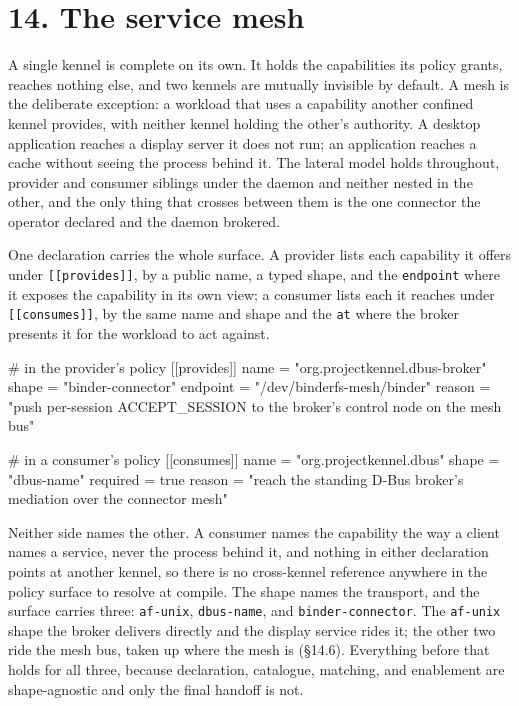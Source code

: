 \hypertarget{the-service-mesh}{%
\chapter{14. The service mesh}\label{the-service-mesh}}

A single kennel is complete on its own. It holds the capabilities its
policy grants, reaches nothing else, and two kennels are mutually
invisible by default. A mesh is the deliberate exception: a workload
that uses a capability another confined kennel provides, with neither
kennel holding the other's authority. A desktop application reaches a
display server it does not run; an application reaches a cache without
seeing the process behind it. The lateral model holds throughout,
provider and consumer siblings under the daemon and neither nested in
the other, and the only thing that crosses between them is the one
connector the operator declared and the daemon brokered.

One declaration carries the whole surface. A provider lists each
capability it offers under \texttt{{[}{[}provides{]}{]}}, by a public
name, a typed shape, and the \texttt{endpoint} where it exposes the
capability in its own view; a consumer lists each it reaches under
\texttt{{[}{[}consumes{]}{]}}, by the same name and shape and the
\texttt{at} where the broker presents it for the workload to act
against.

\begin{kennelcode}
# in the provider's policy
[[provides]]
name = "org.projectkennel.dbus-broker"
shape = "binder-connector"
endpoint = "/dev/binderfs-mesh/binder"
reason = "push per-session ACCEPT_SESSION to the broker's control node on the mesh bus"

# in a consumer's policy
[[consumes]]
name = "org.projectkennel.dbus"
shape = "dbus-name"
required = true
reason = "reach the standing D-Bus broker's mediation over the connector mesh"
\end{kennelcode}

Neither side names the other. A consumer names the capability the way a
client names a service, never the process behind it, and nothing in
either declaration points at another kennel, so there is no cross-kennel
reference anywhere in the policy surface to resolve at compile. The
shape names the transport, and the surface carries three:
\texttt{af-unix}, \texttt{dbus-name}, and \texttt{binder-connector}. The
\texttt{af-unix} shape the broker delivers directly and the display
service rides it; the other two ride the mesh bus, taken up where the
mesh is (§14.6). Everything before that holds for all three, because
declaration, catalogue, matching, and enablement are shape-agnostic and
only the final handoff is not.

